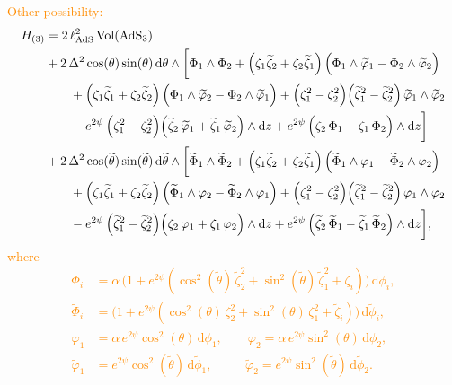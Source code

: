 \documentclass[a4paper, 11pt]{article}
\numberwithin{equation}{section}
\newcommand{\ts}[1]{\widetilde{#1}}
\newcommand{\+}{\oplus}
\renewcommand{\d}{\ensuremath{\mathrm{d}}\xspace}
\newcommand{\CE}[1]{\textcolor{darkorange}{#1}}
\begin{document}
\CE{Other possibility:
\begin{equation}
  \begin{aligned}
    H_{(3)} &= 2\,\ell_{\rm AdS}^{2}\,{\rm Vol}({\rm AdS_{3}})\\
    & + 2\,\Delta^{2}\cos(\theta)\sin(\theta)\,\d\theta\wedge \bigg[\Phi_{1}\wedge\Phi_{2} + \left(\zeta_{1}\ts{\zeta}_{2}+\zeta_{2}\ts{\zeta}_{1}\right)\Big(\Phi_{1}\wedge\ts{\varphi}_{1}-\Phi_{2}\wedge\ts{\varphi}_{2}\Big)\\
    &\qquad+ \left(\zeta_{1}\ts{\zeta}_{1}+\zeta_{2}\ts{\zeta}_{2}\right)\Big(\Phi_{1}\wedge\ts{\varphi}_{2}-\Phi_{2}\wedge\ts{\varphi}_{1}\Big)+\Big(\zeta_{1}^{2}-\zeta_{2}^{2}\Big)\Big(\ts{\zeta}_{1}^{2}-\ts{\zeta}_{2}^{2}\Big)\,\ts{\varphi}_{1}\wedge\ts{\varphi}_{2}\\
    &\qquad-e^{2\psi}\,\Big(\zeta_{1}^{2}-\zeta_{2}^{2}\Big)\Big(\ts{\zeta}_{2}\,\ts{\varphi}_{1}+\ts{\zeta}_{1}\,\ts{\varphi}_{2}\Big)\wedge\d z+e^{2\psi}\,\Big(\zeta_{2}\,\Phi_{1}-\zeta_{1}\,\Phi_{2}\Big)\wedge\d z\bigg]\\
    & + 2\,\Delta^{2}\cos(\ts{\theta})\sin(\ts{\theta})\,\d\ts{\theta}\wedge \bigg[\ts{\Phi}_{1}\wedge\ts{\Phi}_{2} + \left(\zeta_{1}\ts{\zeta}_{2}+\zeta_{2}\ts{\zeta}_{1}\right)\Big(\ts{\Phi}_{1}\wedge\varphi_{1}-\ts{\Phi}_{2}\wedge\varphi_{2}\Big)\\
    &\qquad+ \left(\zeta_{1}\ts{\zeta}_{1}+\zeta_{2}\ts{\zeta}_{2}\right)\Big(\ts{\Phi}_{1}\wedge\varphi_{2}-\ts{\Phi}_{2}\wedge\varphi_{1}\Big)+\Big(\zeta_{1}^{2}-\zeta_{2}^{2}\Big)\Big(\ts{\zeta}_{1}^{2}-\ts{\zeta}_{2}^{2}\Big)\,\varphi_{1}\wedge\varphi_{2}\\
    &\qquad-e^{2\psi}\,\Big(\ts{\zeta}_{1}^{2}-\ts{\zeta}_{2}^{2}\Big)\Big(\zeta_{2}\,\varphi_{1}+\zeta_{1}\,\varphi_{2}\Big)\wedge\d z+e^{2\psi}\,\Big(\ts{\zeta}_{2}\,\ts{\Phi}_{1}-\ts{\zeta}_{1}\,\ts{\Phi}_{2}\Big)\wedge\d z\bigg], 
  \end{aligned}
\end{equation}
where
\begin{equation}
  \begin{aligned}
    \Phi_{i} &= \alpha\,\Big(1+e^{2\psi}\left(\cos^{2}(\ts{\theta})\,\ts{\zeta}_{2}^{2}+\sin^{2}(\ts{\theta})\,\ts{\zeta}_{1}^{2}+\zeta_{i}\right)\Big)\,\d\phi_{i},\\
    \ts{\Phi}_{i} &= \Big(1+e^{2\psi}\left(\cos^{2}(\theta)\,\zeta_{2}^{2}+\sin^{2}(\theta)\,\zeta_{1}^{2}+\ts{\zeta}_{i}\right)\Big)\,\d\ts{\phi}_{i},\\
    \varphi_{1} &= \alpha\,e^{2\psi}\cos^{2}(\theta)\,\d\phi_{1},\qquad
    \varphi_{2} = \alpha\,e^{2\psi}\sin^{2}(\theta)\,\d\phi_{2},\\
    \ts{\varphi}_{1} &= e^{2\psi}\cos^{2}(\ts{\theta})\,\d\ts{\phi}_{1},\qquad\ \ \,
    \ts{\varphi}_{2} = e^{2\psi}\sin^{2}(\ts{\theta})\,\d\ts{\phi}_{2}.
  \end{aligned}
\end{equation}}
\end{document}
